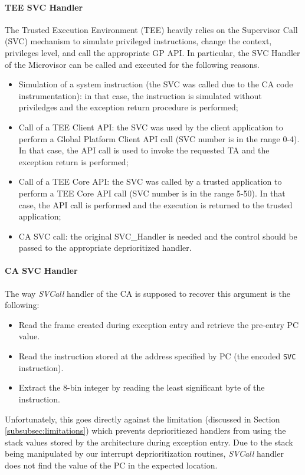 \documentclass{article}
\begin{document}
\paragraph{TEE SVC Handler}

The Trusted Execution Environment (TEE) heavily relies on the Supervisor Call (SVC) mechanism to simulate privileged instructions, change the context, privileges level, and call the appropriate GP API. In particular, the SVC Handler of the Microvisor can be called and executed for the following reasons. 
\begin{itemize}
    \item Simulation of a system instruction (the SVC was called due to the CA code instrumentation): in that case, the instruction is simulated without priviledges and the exception return procedure is performed; 
    \item Call of a TEE Client API: the SVC was used by the client application to perform a Global Platform  Client API call (SVC number is in the range 0-4). In that case, the API call is used to invoke the requested TA and the exception return is performed;
    \item Call of a TEE Core API: the SVC was called by a trusted application to perform a TEE Core API call (SVC number is in the range 5-50). In that case, the API call is performed and the execution is returned to the trusted application;
    \item CA SVC call: the original SVC\_Handler is needed and the control should be passed to the appropriate deprioritized handler.
\end{itemize}

\paragraph{CA SVC Handler}
The way \textit{SVCall} handler of the CA is supposed to recover this argument is the following:
\begin{itemize}
	\item Read the frame created during exception entry and retrieve the pre-entry PC value.
	\item Read the instruction stored at the address specified by PC (the encoded \verb|SVC| instruction).
	\item Extract the 8-bin integer by reading the least significant byte of the instruction.
\end{itemize}

Unfortunately, this goes directly against the limitation (discussed in Section \ref{subsubsec:limitations}) which prevents deprioritiezed handlers from using the stack values stored by the architecture during exception entry. Due to the stack being manipulated by our interrupt deprioritization routines, \textit{SVCall} handler does not find the value of the PC in the expected location.
\end{document}
